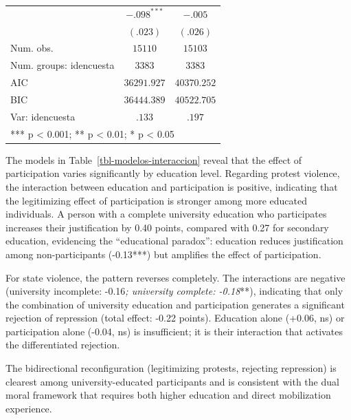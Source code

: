 \documentclass[
  13pt,
]{article}
\begin{document}
\begin{table}
{{\begin{tabular}{l c c}
\quad 2023                                   & $-.098^{***}$ & $-.005$       \\
                                             & $(.023)$      & $(.026)$      \\
\midrule
Num. obs.                                    & $15110$       & $15103$       \\
Num. groups: idencuesta                      & $3383$        & $3383$        \\
AIC                                          & $36291.927$   & $40370.252$   \\
BIC                                          & $36444.389$   & $40522.705$   \\
Var: idencuesta                              & $.133$        & $.197$        \\
\bottomrule
\multicolumn{3}{l}{\scriptsize{*** p < 0.001; ** p < 0.01; * p < 0.05}}
\end{tabular}
}

}

\end{table}%

The models in Table~\ref{tbl-modelos-interaccion} reveal that the effect
of participation varies significantly by education level. Regarding
protest violence, the interaction between education and participation is
positive, indicating that the legitimizing effect of participation is
stronger among more educated individuals. A person with a complete
university education who participates increases their justification by
0.40 points, compared with 0.27 for secondary education, evidencing the
``educational paradox'': education reduces justification among
non-participants (-0.13***) but amplifies the effect of participation.

For state violence, the pattern reverses completely. The interactions
are negative (university incomplete: -0.16\emph{; university complete:
-0.18}**), indicating that only the combination of university education
and participation generates a significant rejection of repression (total
effect: -0.22 points). Education alone (+0.06, ns) or participation
alone (-0.04, ns) is insufficient; it is their interaction that
activates the differentiated rejection.

The bidirectional reconfiguration (legitimizing protests, rejecting
repression) is clearest among university-educated participants and is
consistent with the dual moral framework that requires both higher
education and direct mobilization experience.
\end{document}
